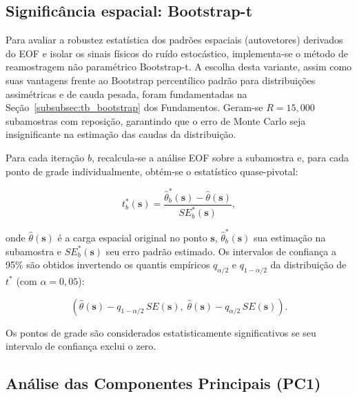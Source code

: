 \subsection{Significância espacial: Bootstrap-t}\label{subsec:bootstrap_significancia}

Para avaliar a robustez estatística dos padrões espaciais (autovetores) derivados do EOF e isolar os sinais físicos do ruído estocástico, implementa-se o método de reamostragem não paramétrico Bootstrap-t. A escolha desta variante, assim como suas vantagens frente ao Bootstrap percentílico padrão para distribuições assimétricas e de cauda pesada, foram fundamentadas na Seção~\ref{subsubsec:tb_bootstrap} dos Fundamentos. Geram-se $R = 15{,}000$ subamostras com reposição, garantindo que o erro de Monte Carlo seja insignificante na estimação das caudas da distribuição.

Para cada iteração $b$, recalcula-se a análise EOF sobre a subamostra e, para cada ponto de grade individualmente, obtém-se o estatístico quase-pivotal:

\begin{equation}
    t^*_b(\mathbf{s}) = \frac{\hat{\theta}^*_b(\mathbf{s}) - \hat{\theta}(\mathbf{s})}{SE^*_b(\mathbf{s})},
\end{equation}

onde $\hat{\theta}(\mathbf{s})$ é a carga espacial original no ponto $\mathbf{s}$, $\hat{\theta}^*_b(\mathbf{s})$ sua estimação na subamostra e $SE^*_b(\mathbf{s})$ seu erro padrão estimado. Os intervalos de confiança a 95\% são obtidos invertendo os quantis empíricos $q_{\alpha/2}$ e $q_{1-\alpha/2}$ da distribuição de $t^*$ (com $\alpha = 0{,}05$):

\begin{equation}
    \left(\hat{\theta}(\mathbf{s}) - q_{1-\alpha/2}\,SE(\mathbf{s}),\; \hat{\theta}(\mathbf{s}) - q_{\alpha/2}\,SE(\mathbf{s})\right).
\end{equation}

Os pontos de grade são considerados estatisticamente significativos se seu intervalo de confiança exclui o zero.

\subsection{Análise das Componentes Principais (PC1)}\label{subsec:analisis_pc}

